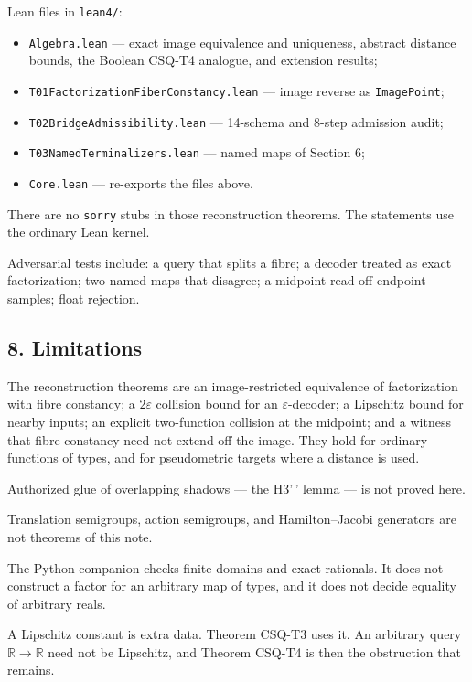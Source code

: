 \documentclass[
  11pt,
]{article}
\providecommand{\tightlist}{%
  \setlength{\itemsep}{0pt}\setlength{\parskip}{0pt}}
\begin{document}
Lean files in \texttt{lean4/}:

\begin{itemize}
\tightlist
\item
  \nolinkurl{Algebra.lean} --- exact image equivalence and uniqueness, abstract distance bounds, the Boolean CSQ-T4 analogue, and extension results;
\item
  \nolinkurl{T01FactorizationFiberConstancy.lean} --- image reverse as \texttt{ImagePoint};
\item
  \nolinkurl{T02BridgeAdmissibility.lean} --- 14-schema and 8-step admission audit;
\item
  \nolinkurl{T03NamedTerminalizers.lean} --- named maps of Section 6;
\item
  \texttt{Core.lean} --- re-exports the files above.
\end{itemize}

There are no \texttt{sorry} stubs in those reconstruction theorems. The statements use the ordinary Lean kernel.

Adversarial tests include: a query that splits a fibre; a decoder treated as exact factorization; two named maps that disagree; a midpoint read off endpoint samples; float rejection.

\subsection{8. Limitations}\label{limitations}

The reconstruction theorems are an image-restricted equivalence of factorization with fibre constancy; a \(2\varepsilon\) collision bound for an \(\varepsilon\)-decoder; a Lipschitz bound for nearby inputs; an explicit two-function collision at the midpoint; and a witness that fibre constancy need not extend off the image. They hold for ordinary functions of types, and for pseudometric targets where a distance is used.

Authorized glue of overlapping shadows --- the H3'\,' lemma --- is not proved here.

Translation semigroups, action semigroups, and Hamilton--Jacobi generators are not theorems of this note.

The Python companion checks finite domains and exact rationals. It does not construct a factor for an arbitrary map of types, and it does not decide equality of arbitrary reals.

A Lipschitz constant is extra data. Theorem CSQ-T3 uses it. An arbitrary query \(\mathbb{R}\to\mathbb{R}\) need not be Lipschitz, and Theorem CSQ-T4 is then the obstruction that remains.
\end{document}
